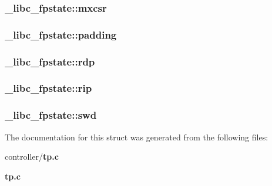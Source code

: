 \subsubsection[{mxcsr}]{ {\bf \_\-libc\_\-fpstate::mxcsr}}\label{struct__libc__fpstate_ae71198c1a5a86955ca840b97387e7fdd}
\subsubsection[{padding}]{ {\bf \_\-libc\_\-fpstate::padding}}\label{struct__libc__fpstate_a11058f071825211de2d85b4408744d1c}
\subsubsection[{rdp}]{ {\bf \_\-libc\_\-fpstate::rdp}}\label{struct__libc__fpstate_a8d62655add2abcbddba208cf37a3ddbf}
\subsubsection[{rip}]{ {\bf \_\-libc\_\-fpstate::rip}}\label{struct__libc__fpstate_ac74c860b128f2f9c7ae50c7f3fe2515c}
\subsubsection[{swd}]{ {\bf \_\-libc\_\-fpstate::swd}}\label{struct__libc__fpstate_ae3979a0ead7b05c1b49a5926f02b5b15}


The documentation for this struct was generated from the following files:\begin{DoxyCompactItemize}
\item 
controller/{\bf tp.c}\item 
{\bf tp.c}\end{DoxyCompactItemize}
